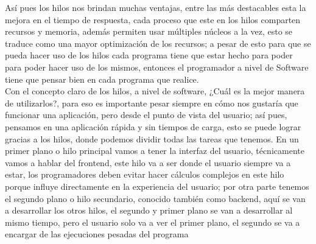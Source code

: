 \documentclass{article}
\begin{document}
Así pues los hilos nos brindan muchas ventajas, entre las más destacables esta la mejora en el tiempo de respuesta, cada proceso que este en los hilos comparten recursos y memoria, además permiten usar múltiples núcleos a la vez, esto se traduce como una mayor optimización de los recursos; a pesar de esto para que se pueda hacer uso de los hilos cada programa tiene que estar hecho para poder para poder hacer uso de los mismos, entonces el programador a nivel de Software tiene que pensar bien en cada programa que realice.\\

Con el concepto claro de los hilos, a nivel de software, ¿Cuál es la mejor manera de utilizarlos?, para eso es importante pesar siempre en cómo nos gustaría que funcionar una aplicación, pero desde el punto de vista del usuario; así pues, pensamos en una aplicación rápida y sin tiempos de carga, esto se puede lograr gracias a los hilos, donde podemos dividir todas las tareas que tenemos. En un primer plano o hilo principal vamos a tener la interfaz del usuario, técnicamente vamos a hablar del frontend, este hilo va a ser donde el usuario siempre va a estar, los programadores deben evitar hacer cálculos complejos en este hilo porque influye directamente en la experiencia del usuario; por otra parte tenemos el segundo plano o hilo secundario, conocido también como backend, aquí se van a desarrollar los otros hilos, el segundo y primer plano se van a desarrollar al mismo tiempo, pero el usuario solo va a ver el primer plano, el segundo se va a encargar de las ejecuciones pesadas del programa\\ 
\end{document}

